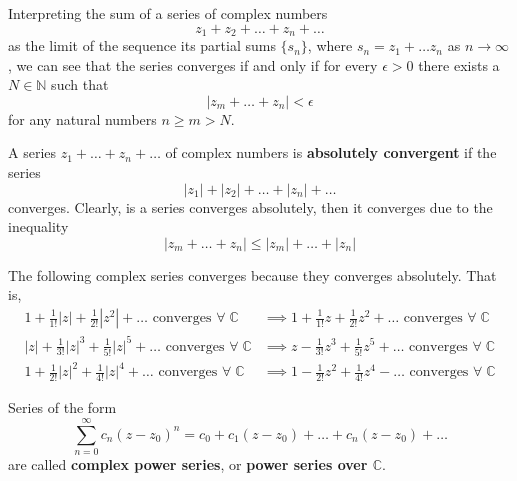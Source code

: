     \begin{lemma}
      Interpreting the sum of a series of complex numbers
      \[z_1 + z_2 + \ldots + z_n + \ldots\]
      as the limit of the sequence its partial sums $\{s_n\}$, where $s_n = z_1 + \ldots z_n$ as $n \rightarrow \infty$, we can see that the series converges if and only if for every $\epsilon > 0$ there exists a $N \in \mathbb{N}$ such that 
      \[|z_m + \ldots + z_n| < \epsilon\]
      for any natural numbers $n \geq m > N$. 
    \end{lemma}

    \begin{definition}
      A series $z_1 + \ldots + z_n + \ldots$ of complex numbers is \textbf{absolutely convergent} if the series
      \[|z_1| + |z_2| + \ldots + |z_n| + \ldots\]
      converges. Clearly, is a series converges absolutely, then it converges due to the inequality
      \[|z_m + \ldots + z_n| \leq |z_m| + \ldots + |z_n|\]
    \end{definition}

    \begin{example}
      The following complex series converges because they converges absolutely. That is, 
      \begin{align*}
          1 + \frac{1}{1!}|z| + \frac{1}{2!}|z^2| + \ldots \text{ converges } \forall \; \mathbb{C} & \implies 1 + \frac{1}{1!}z + \frac{1}{2!}z^2 + \ldots \text{ converges } \forall \; \mathbb{C} \\
          |z| + \frac{1}{3!}|z|^3 + \frac{1}{5!}|z|^5 + \ldots \text{ converges } \forall \; \mathbb{C}  & \implies z - \frac{1}{3!} z^3 + \frac{1}{5!}z^5 + \ldots \text{ converges } \forall \; \mathbb{C} \\
          1 + \frac{1}{2!}|z|^2 + \frac{1}{4!} |z|^4 + \ldots \text{ converges }  \forall \; \mathbb{C} & \implies 1 - \frac{1}{2!}z^2 + \frac{1}{4!} z^4 - \ldots \text{ converges }  \forall \; \mathbb{C} 
      \end{align*}
    \end{example}

    \begin{definition}
      Series of the form 
      \[\sum_{n=0}^\infty c_n (z - z_0)^n = c_0 + c_1 (z - z_0) + \ldots + c_n (z - z_0) + \ldots\]
      are called \textbf{complex power series}, or \textbf{power series over $\mathbb{C}$}. 
    \end{definition}

